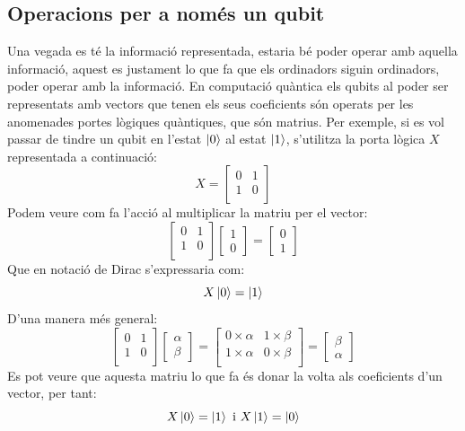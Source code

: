 \subsection{Operacions per a només un qubit}
\label{only_one_qubit}
Una vegada es té la informació representada, estaria bé poder operar amb aquella informació, aquest es justament lo que fa que els ordinadors siguin ordinadors, poder operar amb la informació. En computació quàntica els qubits al poder ser representats amb vectors que tenen els seus coeficients són operats per les anomenades portes lògiques quàntiques, que són matrius. Per exemple, si es vol passar de tindre un qubit en l'estat $\ket{0}$ al estat $\ket{1}$, s'utilitza la porta lògica $X$ representada a continuació:
$$
X = \begin{bmatrix}
	0 & 1\\
	1 & 0\\
\end{bmatrix}
$$ 
Podem veure com fa l'acció al multiplicar la matriu per el vector: 
$$
\begin{bmatrix} 0 & 1\\ 1 & 0\\ \end{bmatrix} \begin{bmatrix}1 \\ 0 \end{bmatrix} = \begin{bmatrix}0 \\ 1 \end{bmatrix}
$$
Que en notació de Dirac s'expressaria com: 
$$
X\ket{0} = \ket{1}
$$
D'una manera més general: 
$$
\begin{bmatrix} 0 & 1\\ 1 & 0\\ \end{bmatrix} \begin{bmatrix}\alpha \\ \beta \end{bmatrix} =
\begin{bmatrix} 0\times\alpha & 1\times\beta \\
	1\times\alpha & 0\times\beta \\
\end{bmatrix}
= \begin{bmatrix} \beta \\ \alpha \end{bmatrix}
$$
Es pot veure que aquesta matriu lo que fa és donar la volta als coeficients d'un vector, per tant:
$$
X\ket{0} = \ket{1} \text{ i } X\ket{1} = \ket{0}
$$


